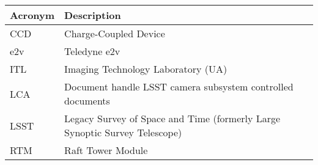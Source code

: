 \addtocounter{table}{-1}
\begin{longtable}{p{}p{}}\hline
\textbf{Acronym} & \textbf{Description}  \\\hline

CCD & Charge-Coupled Device \\\hline
e2v & Teledyne e2v \\\hline
ITL & Imaging Technology Laboratory (UA) \\\hline
LCA & Document handle LSST camera subsystem controlled documents \\\hline
LSST & Legacy Survey of Space and Time (formerly Large Synoptic Survey Telescope) \\\hline
RTM & Raft Tower Module \\\hline
\end{longtable}
